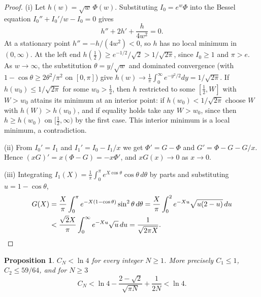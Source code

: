 \documentclass[11pt]{amsart}
\newtheorem{proposition}[theorem]{Proposition}
\theoremstyle{definition}
\theoremstyle{remark}
\begin{document}
\begin{proof}
(i) Let $h(w)=\sqrt w\,\Phi(w)$. Substituting $I_0=e^w\Phi$ into the Bessel equation $I_0''+I_0'/w-I_0=0$ gives
\[
 h''+2h'+\frac{h}{4w^2}=0.
\]
At a stationary point $h''=-h/(4w^2)<0$, so $h$ has no local minimum in $(0,\infty)$. At the left end $h(\tfrac12)\ge e^{-1/2}/\sqrt2>1/\sqrt{2\pi}$, since $I_0\ge1$ and $\pi>e$. As $w\to\infty$, the substitution $\theta=y/\sqrt w$ and dominated convergence (with $1-\cos\theta\ge2\theta^2/\pi^2$ on $[0,\pi]$) give $h(w)\to\frac1\pi\int_0^\infty e^{-y^2/2}dy=1/\sqrt{2\pi}$. If $h(w_0)\le1/\sqrt{2\pi}$ for some $w_0>\tfrac12$, then $h$ restricted to some $[\tfrac12,W]$ with $W>w_0$ attains its minimum at an interior point: if $h(w_0)<1/\sqrt{2\pi}$ choose $W$ with $h(W)>h(w_0)$, and if equality holds take any $W>w_0$, since then $h\ge h(w_0)$ on $[\tfrac12,\infty)$ by the first case. This interior minimum is a local minimum, a contradiction.

(ii) From $I_0'=I_1$ and $I_1'=I_0-I_1/x$ we get $\Phi'=G-\Phi$ and $G'=\Phi-G-G/x$. Hence $(xG)'=x(\Phi-G)=-x\Phi'$, and $xG(x)\to0$ as $x\to0$.

(iii) Integrating $I_1(X)=\frac1\pi\int_0^\pi e^{X\cos\theta}\cos\theta\,d\theta$ by parts and substituting $u=1-\cos\theta$,
\begin{align*}
 G(X)&=\frac X\pi\int_0^\pi e^{-X(1-\cos\theta)}\sin^2\theta\,d\theta
 =\frac X\pi\int_0^2e^{-Xu}\sqrt{u(2-u)}\,du\\
 &<\frac{\sqrt2X}{\pi}\int_0^\infty e^{-Xu}\sqrt u\,du=\frac1{\sqrt{2\pi X}}.\qedhere
\end{align*}
\end{proof}

\begin{proposition}\label{prop:CN}
$C_N<\ln4$ for every integer $N\ge1$. More precisely $C_1\le1$, $C_2\le59/64$, and for $N\ge3$
\[
 C_N<\ln4-\frac{2-\sqrt2}{\sqrt{\pi N}}+\frac1{2N}<\ln4.
\]
\end{proposition}
\end{document}
